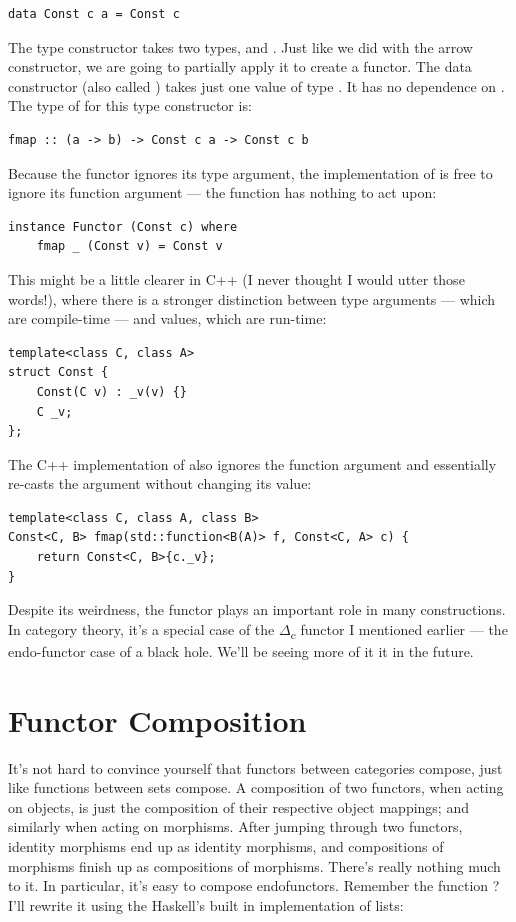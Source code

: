\begin{verbatim}
data Const c a = Const c
\end{verbatim}
The  type constructor takes two types,  and
. Just like we did with the arrow constructor, we are going to
partially apply it to create a functor. The data constructor (also
called ) takes just one value of type . It has
no dependence on . The type of  for this type
constructor is:

\begin{verbatim}
fmap :: (a -> b) -> Const c a -> Const c b
\end{verbatim}
Because the functor ignores its type argument, the implementation of
 is free to ignore its function argument --- the function
has nothing to act upon:

\begin{verbatim}
instance Functor (Const c) where
    fmap _ (Const v) = Const v
\end{verbatim}
This might be a little clearer in C++ (I never thought I would utter
those words!), where there is a stronger distinction between type
arguments --- which are compile-time --- and values, which are run-time:

\begin{verbatim}
template<class C, class A>
struct Const { 
    Const(C v) : _v(v) {}
    C _v;
};
\end{verbatim}
The C++ implementation of  also ignores the function
argument and essentially re-casts the  argument without
changing its value:

\begin{verbatim}
template<class C, class A, class B>
Const<C, B> fmap(std::function<B(A)> f, Const<C, A> c) {
    return Const<C, B>{c._v};
}
\end{verbatim}
Despite its weirdness, the  functor plays an important
role in many constructions. In category theory, it's a special case of
the \ensuremath{\Delta}\textsubscript{c} functor I mentioned earlier --- the endo-functor
case of a black hole. We'll be seeing more of it it in the future.

\section{Functor Composition}\label{functor-composition}

It's not hard to convince yourself that functors between categories
compose, just like functions between sets compose. A composition of two
functors, when acting on objects, is just the composition of their
respective object mappings; and similarly when acting on morphisms.
After jumping through two functors, identity morphisms end up as
identity morphisms, and compositions of morphisms finish up as
compositions of morphisms. There's really nothing much to it. In
particular, it's easy to compose endofunctors. Remember the function
? I'll rewrite it using the Haskell's built in
implementation of lists:

